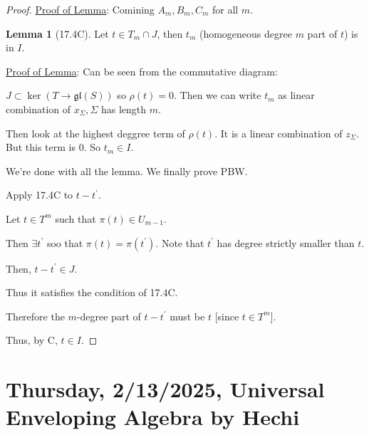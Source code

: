 \documentclass{article}
\theoremstyle{definition}
\newtheorem{lemma}[theorem]{Lemma}
\begin{document}
\begin{proof}
        \underline{Proof of Lemma}: Comining \(A_m, B_m, C_m\) for all \(m\).

        \begin{lemma}
            [17.4C]

            Let \(t \in T_m \cap J\), then \(t_m\) (homogeneous degree \(m\) part of \(t\)) is in \(I\).
        \end{lemma}

        \underline{Proof of Lemma}: Can be seen from the commutative diagram:
        
        \begin{center}
        \end{center}

        \(J \subset \ker (T \to \mathfrak{gl}(S))\) so \(\rho(t) = 0\). Then we can write \(t_m\) as linear combination of \(x_\Sigma, \Sigma\) has length \(m\).
        
        Then look at the highest deggree term of \(\rho(t)\). It is a linear combination of \(z_\Sigma\). But this term is \(0\). So \(t_m \in I\).

        We're done with all the lemma. We finally prove PBW.

        Apply 17.4C to \(t - t^{\prime}\). 
        
        Let \(t \in T^m\) such that \(\pi (t) \in U_{m-1}\).

        Then \(\exists t^{\prime}\) soo that \(\pi(t) = \pi(t^{\prime})\). Note that \(t^{\prime}\) has degree strictly smaller than \(t\).
        
        Then, \(t-t^{\prime} \in J\).

        Thus it satisfies the condition of 17.4C.

        Therefore the \(m\)-degree part of \(t - t^{\prime}\) must be \(t\) [since \(t\in T^m\)].

        Thus, by C, \(t\in I\).

    \end{proof}

    \section{Thursday, 2/13/2025, Universal Enveloping Algebra by Hechi}
\end{document}
